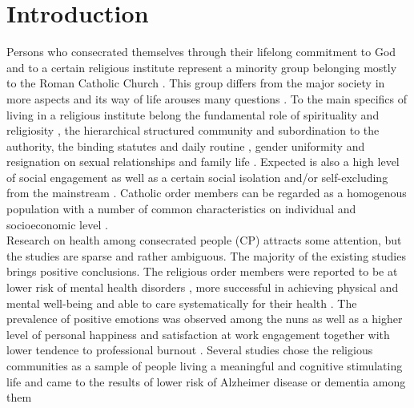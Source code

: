 \documentclass[ijerph,article,accept,moreauthors,pdftex]{mdpi}
\begin{document}

\hypertarget{introduction}{%
\section{Introduction}\label{introduction}}

Persons who consecrated themselves through their lifelong commitment to
God and to a certain religious institute represent a minority group
belonging mostly to the Roman Catholic Church
\citep{holtz2006geschichte, frank1988geschichte}. This group differs
from the major society in more aspects and its way of life arouses many
questions \citep{cist2019living, elias2019monasticism}. To the main
specifics of living in a religious institute belong the fundamental role
of spirituality \citep{bussing2017validation} and religiosity
\citep{quartier2017monastic}, the hierarchical structured community and
subordination to the authority, the binding statutes and daily routine
\citep{wrobel2018duties, fernandez2019convents}, gender uniformity and
resignation on sexual relationships and family life
\citep{huel2018missionaries}. Expected is also a high level of social
engagement \citep{bickerton2013spiritual} as well as a certain social
isolation and/or self-excluding from the mainstream
\citep{jewdokimow2019transcending, meawad2020sexuality}. Catholic order
members can be regarded as a homogenous population with a number of
common characteristics on individual and socioeconomic level
\citep{bowen2018community}.\\
Research on health among consecrated people (CP) attracts some
attention, but the studies are sparse and rather ambiguous. The majority
of the existing studies brings positive conclusions. The religious order
members were reported to be at lower risk of mental health disorders
\citep{rogowska2020investigating}, more successful in achieving physical
and mental well-being \citep{corwin2014lord} and able to care
systematically for their health \citep{huck1996health}. The prevalence
of positive emotions was observed among the nuns
\citep{skrzypinska2012intricacies} as well as a higher level of personal
happiness \citep{francis2018happiness} and satisfaction at work
engagement \citep{ariza2018work} together with lower tendence to
professional burnout \citep{chirico2020spirituality}. Several studies
chose the religious communities as a sample of people living a
meaningful and cognitive stimulating life and came to the results of
lower risk of Alzheimer disease or dementia among them
\end{document}
